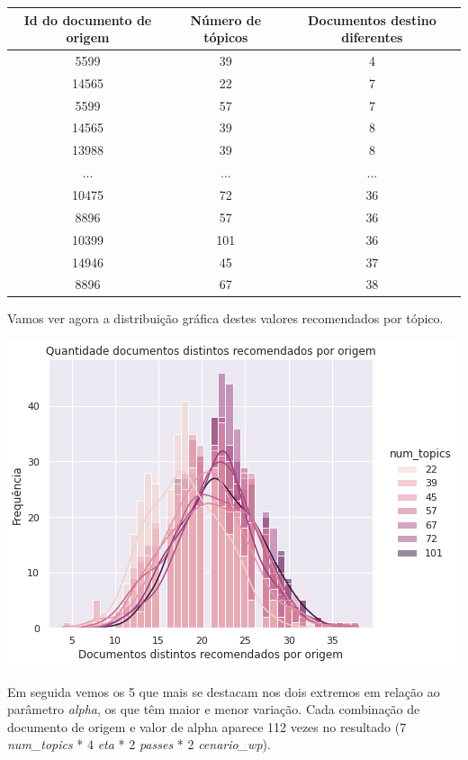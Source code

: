 \begin{center}
    \begin{tabular}{|c|c|c|}
        \hline
        Id do documento de origem & Número de tópicos & Documentos destino diferentes \\
        \hline
        5599 & 39 & 4 \\
        \hline
        14565 & 22 & 7 \\
        \hline
        5599 & 57 & 7 \\
        \hline
        14565 & 39 & 8 \\
        \hline
        13988 & 39 & 8 \\
        \hline
        ... & ... & ... \\
        \hline
        10475 & 72 & 36 \\
        \hline
        8896 & 57 & 36 \\
        \hline
        10399 & 101 & 36 \\
        \hline
        14946 & 45 & 37 \\
        \hline
        8896 & 67 & 38 \\
        \hline
    \end{tabular}
\end{center}

Vamos ver agora a distribuição gráfica destes valores recomendados por tópico.

\includegraphics[scale=0.7]{resultados/resources/distribuicao_semelhantes_distintos_topics.png}

Em seguida vemos os 5 que mais se destacam nos dois extremos em relação ao parâmetro \textit{alpha}, os que têm maior e menor variação. 
Cada combinação de documento de origem e valor de alpha aparece 112 vezes no resultado (7 \textit{num\_topics} * 4 \textit{eta} * 2 \textit{passes} * 2 \textit{cenario\_wp}).

